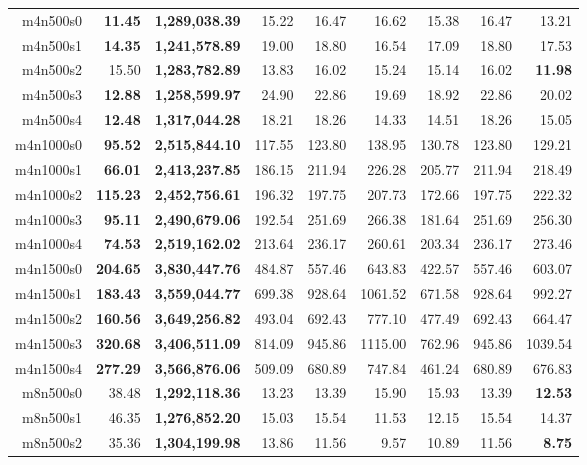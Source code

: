 \documentclass{article}
\begin{document}
\begin{landscape}
\begin{table}[!htb]
\begin{tabular}{rrrrrrrrr}
      m4n500s0 & \textbf{11.45} & \textbf{1,289,038.39} & 15.22 & 16.47 & 16.62 & 15.38 & 16.47 & 13.21 \\
      m4n500s1 & \textbf{14.35} & \textbf{1,241,578.89} & 19.00 & 18.80 & 16.54 & 17.09 & 18.80 & 17.53 \\
      m4n500s2 & 15.50 & \textbf{1,283,782.89} & 13.83 & 16.02 & 15.24 & 15.14 & 16.02 & \textbf{11.98} \\
      m4n500s3 & \textbf{12.88} & \textbf{1,258,599.97} & 24.90 & 22.86 & 19.69 & 18.92 & 22.86 & 20.02 \\
      m4n500s4 & \textbf{12.48} & \textbf{1,317,044.28} & 18.21 & 18.26 & 14.33 & 14.51 & 18.26 & 15.05 \\
      m4n1000s0 & \textbf{95.52} & \textbf{2,515,844.10} & 117.55 & 123.80 & 138.95 & 130.78 & 123.80 & 129.21 \\
      m4n1000s1 & \textbf{66.01} & \textbf{2,413,237.85} & 186.15 & 211.94 & 226.28 & 205.77 & 211.94 & 218.49 \\
      m4n1000s2 & \textbf{115.23} & \textbf{2,452,756.61} & 196.32 & 197.75 & 207.73 & 172.66 & 197.75 & 222.32 \\
      m4n1000s3 & \textbf{95.11} & \textbf{2,490,679.06} & 192.54 & 251.69 & 266.38 & 181.64 & 251.69 & 256.30 \\
      m4n1000s4 & \textbf{74.53} & \textbf{2,519,162.02} & 213.64 & 236.17 & 260.61 & 203.34 & 236.17 & 273.46 \\
      m4n1500s0 & \textbf{204.65} & \textbf{3,830,447.76} & 484.87 & 557.46 & 643.83 & 422.57 & 557.46 & 603.07 \\
      m4n1500s1 & \textbf{183.43} & \textbf{3,559,044.77} & 699.38 & 928.64 & 1061.52 & 671.58 & 928.64 & 992.27 \\
      m4n1500s2 & \textbf{160.56} & \textbf{3,649,256.82} & 493.04 & 692.43 & 777.10 & 477.49 & 692.43 & 664.47 \\
      m4n1500s3 & \textbf{320.68} & \textbf{3,406,511.09} & 814.09 & 945.86 & 1115.00 & 762.96 & 945.86 & 1039.54 \\
      m4n1500s4 & \textbf{277.29} & \textbf{3,566,876.06} & 509.09 & 680.89 & 747.84 & 461.24 & 680.89 & 676.83 \\
      \midrule
      m8n500s0 & 38.48 & \textbf{1,292,118.36} & 13.23 & 13.39 & 15.90 & 15.93 & 13.39 & \textbf{12.53} \\
      m8n500s1 & 46.35 & \textbf{1,276,852.20} & 15.03 & 15.54 & 11.53 & 12.15 & 15.54 & 14.37 \\
      m8n500s2 & 35.36 & \textbf{1,304,199.98} & 13.86 & 11.56 & 9.57 & 10.89 & 11.56 & \textbf{8.75} \\

\end{tabular}
\end{table}
\end{landscape}
\end{document}

